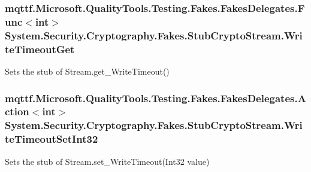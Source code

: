 \hypertarget{class_system_1_1_security_1_1_cryptography_1_1_fakes_1_1_stub_crypto_stream_a49cc1d261dd8f36119c8108b36fa8db3}{
\subsubsection[{Write\-Timeout\-Get}]{\setlength{\rightskip}{0pt plus 5cm}mqttf.\-Microsoft.\-Quality\-Tools.\-Testing.\-Fakes.\-Fakes\-Delegates.\-Func$<$int$>$ System.\-Security.\-Cryptography.\-Fakes.\-Stub\-Crypto\-Stream.\-Write\-Timeout\-Get}}\label{class_system_1_1_security_1_1_cryptography_1_1_fakes_1_1_stub_crypto_stream_a49cc1d261dd8f36119c8108b36fa8db3}


Sets the stub of Stream.\-get\-\_\-\-Write\-Timeout()

\hypertarget{class_system_1_1_security_1_1_cryptography_1_1_fakes_1_1_stub_crypto_stream_ae42080b57dc0086a3062c0a4e84d269d}{
\subsubsection[{Write\-Timeout\-Set\-Int32}]{\setlength{\rightskip}{0pt plus 5cm}mqttf.\-Microsoft.\-Quality\-Tools.\-Testing.\-Fakes.\-Fakes\-Delegates.\-Action$<$int$>$ System.\-Security.\-Cryptography.\-Fakes.\-Stub\-Crypto\-Stream.\-Write\-Timeout\-Set\-Int32}}\label{class_system_1_1_security_1_1_cryptography_1_1_fakes_1_1_stub_crypto_stream_ae42080b57dc0086a3062c0a4e84d269d}


Sets the stub of Stream.\-set\-\_\-\-Write\-Timeout(\-Int32 value)



